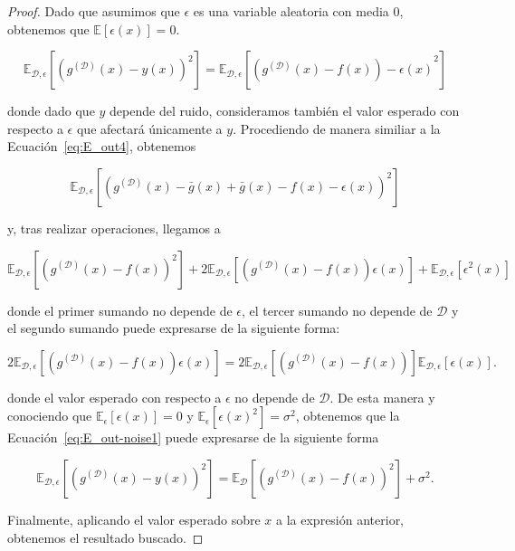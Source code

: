 \begin{proof}
    Dado que asumimos que $\epsilon$ es una variable aleatoria con media $0$, obtenemos que $\mathbb{E}[\epsilon(x)] = 0$.

    \begin{equation}\label{eq:E_out-noise1}
        \mathbb{E}_{\mathcal{D}, \epsilon}[{(g^{\mathcal{(D)}}(x) - y(x))}^2] = \mathbb{E}_{\mathcal{D}, \epsilon}[{(g^{\mathcal{(D)}}(x) - f(x)) - \epsilon(x)}^2]
    \end{equation}

    donde dado que $y$ depende del ruido, consideramos también el valor esperado con respecto a $\epsilon$ que afectará únicamente a $y$. Procediendo de manera similiar a la Ecuación~\eqref{eq:E_out4}, obtenemos

    \begin{equation}
        \mathbb{E}_{\mathcal{D}, \epsilon}[{(g^{\mathcal{(D)}}(x) - \bar{g}(x) + \bar{g}(x) - f(x) - \epsilon(x))}^2]
    \end{equation}

    y, tras realizar operaciones, llegamos a

    \begin{equation}
        \mathbb{E}_{\mathcal{D}, \epsilon}[{(g^{\mathcal{(D)}}(x) - f(x))}^2] + 2\mathbb{E}_{\mathcal{D}, \epsilon}[(g^{\mathcal{(D)}}(x)-f(x))\epsilon(x)] + \mathbb{E}_{\mathcal{D}, \epsilon}[\epsilon^{2}(x)]
    \end{equation}

    donde el primer sumando no depende de $\epsilon$, el tercer sumando no depende de $\mathcal{D}$ y el segundo sumando puede expresarse de la siguiente forma:

    \begin{equation}
        2\mathbb{E}_{\mathcal{D}, \epsilon}[(g^{\mathcal{(D)}}(x)-f(x))\epsilon(x)] = 2\mathbb{E}_{\mathcal{D}, \epsilon}[(g^{\mathcal{(D)}}(x)-f(x))]\mathbb{E}_{\mathcal{D}, \epsilon}[\epsilon(x)].
    \end{equation}

    donde el valor esperado con respecto a $\epsilon$ no depende de $\mathcal{D}$. De esta manera y conociendo que $\mathbb{E}_{\epsilon}[\epsilon(x)] = 0$ y $\mathbb{E}_{\epsilon}[{\epsilon(x)}^{2}] = \sigma^{2}$, obtenemos que la Ecuación~\eqref{eq:E_out-noise1} puede expresarse de la siguiente forma

    \begin{equation}
        \mathbb{E}_{\mathcal{D}, \epsilon}[{(g^{\mathcal{(D)}}(x) - y(x))}^2] = \mathbb{E}_{\mathcal{D}}[{(g^{\mathcal{(D)}}(x) - f(x))}^2] + \sigma^{2}.
    \end{equation}

    Finalmente, aplicando el valor esperado sobre $x$ a la expresión anterior, obtenemos el resultado buscado.\newline
\end{proof}

